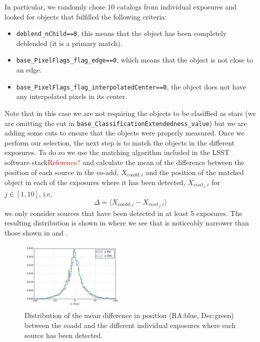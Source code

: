 \documentclass[\docopts]{\docclass}
\begin{document}
In particular, we randomly chose 10 catalogs from individual exposures and looked for objects that fulfilled the following criteria:
\begin{itemize}
  \item \texttt{deblend\_nChild==0}, this means that the object has been completely deblended (it is a primary match).
  \item \texttt{base\_PixelFlags\_flag\_edge==0}, which means that the object is not close to an edge.
  \item \texttt{base\_PixelFlags\_flag\_interpolatedCenter==0}, the object does not have any interpolated pixels in its center.
\end{itemize}
Note that in this case we are not requiring the objects to be clasiffied as stars (we are omitting the cut in
\texttt{base\_ClassificationExtendedness\_value}) but we are adding some cuts to ensure that the objects were properly measured. Once
we perform our selection, the next step is to match the objects in the different exposures. To do so we use the matching algorithm
included in the LSST software stack\textcolor{red}{Reference?} and calculate the mean of the difference between the position of each source
in the co-add, $X_{coadd,i}$ and the position of the matched object in each of the exposures where it has been detected, $X_{visit_{j},i}$
for $j \in [1,10]$, i.e,
\begin{equation}
  \Delta = \langle X_{coadd,i} - X_{visit_{j},i} \rangle
\end{equation}
we only consider sources that have been detected in at least 5 exposures. The resulting distribution is shown in 
where we see that is noticeably narrower than those shown in  and .
\begin{figure}
  \centering
  \includegraphics[width=0.45\textwidth]{astrometry_internal_10visits_imsim_undithered}
  \caption{Distribution of the mean difference in position (RA:blue, Dec:green) between the coadd and the different individual exposures
  where each source has been detected.}
  \label{fig:astrometry_internal}
\end{figure}
\end{document}
